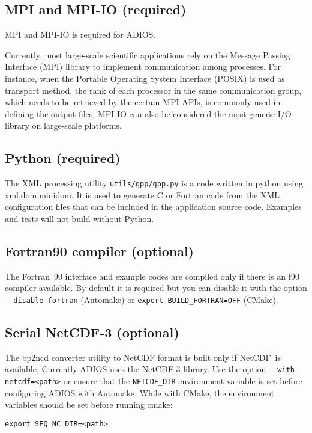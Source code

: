 \subsection{MPI and MPI-IO (required)}

MPI and MPI-IO is required for ADIOS.

Currently, most large-scale scientific applications rely on the Message Passing
Interface (MPI) library to implement communication among processes. For instance,
when the Portable Operating System Interface (POSIX) is used as transport method,
the rank of each processor in the same communication group, which needs to be retrieved
by the certain MPI APIs, is commonly used in defining the output files. MPI-IO
can also be considered the most generic I/O library on large-scale platforms.

\subsection{Python (required)}

The XML processing utility \verb+utils/gpp/gpp.py+ is a code written in python using xml.dom.minidom.
It is used to generate C or Fortran code from the XML configuration files that
can be included in the application source code.  Examples and tests will not build
without Python.

\subsection{Fortran90 compiler (optional)}

The Fortran~90 interface and example codes are compiled only if there is an f90
compiler available. By default it is required but you can disable it with the option
\verb+--disable-fortran+ (Automake) or \verb+export BUILD_FORTRAN=OFF+ (CMake).

\subsection{Serial NetCDF-3 (optional)}

The bp2ncd converter utility to NetCDF format is built only if NetCDF~is available.
 Currently ADIOS uses the NetCDF-3 library. Use the option \verb+--with-netcdf=<path>+
or ensure that the \verb+NETCDF_DIR+ environment variable is set before configuring ADIOS with Automake.
While with CMake, the environment variables should be set before running cmake:
\begin{lstlisting}
export SEQ_NC_DIR=<path>
\end{lstlisting}

